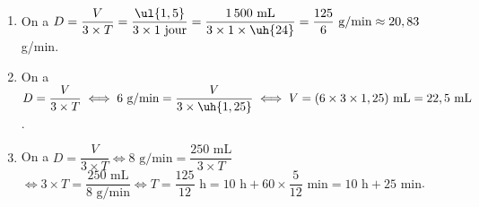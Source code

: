 \ \\ [-5mm]
\begin{enumerate}
   \item On a $D =\dfrac{V}{3\times T} =\dfrac{\ul{1,5}}{3\times1\text{ jour}} =\dfrac{1\,500\text{ mL}}{3\times1\times\uh{24}} =\dfrac{125}{6}\text{ g/min} \approx20,83$ g/min. \\ [1mm]
   \item On a $D =\dfrac{V}{3\times T} \iff 6\text{ g/min} =\dfrac{V}{3\times\uh{1,25}} \iff V =(6\times3\times1,25)\text{ mL} =22,5\text{ mL}$. \\ [1mm]
   \smallskip
   \item On a $D =\dfrac{V}{3\times T} \iff 8\text{ g/min} =\dfrac{250\text{ mL}}{3\times T}$ \\ [1mm]
   $\iff 3\times T =\dfrac{250\text{ mL}}{8\text{ g/min}} \iff T =\dfrac{125}{12} \text{ h} =10\text{ h}+60\times\dfrac{5}{12}\text{ min} =10\text{ h}+25\text{ min}$. \\ [1mm]
   \end{enumerate}
